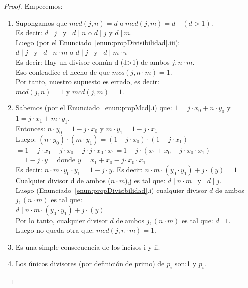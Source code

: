 \begin{proof} Empecemos:
\begin{enumerate}[label=\roman*)]
\item Supongamos que $mcd(j, n)=d$ \quad o \quad $mcd(j, m)=d \quad (d>1)$. \\
Es decir: $d \mid j$ \, y \, $d \mid n$ \quad\quad o \quad\quad $d \mid j$ y $d \mid m$.\\
Luego (por el Enunciado~\ref{enun:propDivisibilidad}.iii):\\
$d \mid j$ \, y \, $d \mid n \cdot m$ \quad o \quad $d \mid  j$ \, y \, $d \mid m \cdot n$\\
Es decir: Hay un divisor común d (d>1) de ambos $j,n \cdot m$.\\
Eso contradice el hecho de que $mcd(j,n \cdot m)=1$.\\
Por tanto, nuestro supuesto es errado, es decir:\\
$mcd(j, n)=1$ y $mcd(j, m)=1$.
\item Sabemos (por el Enunciado~\ref{enun:propMcd}.i) que: $1=j \cdot x_{0} + n \cdot y_{0}$ \quad y \quad $1=j \cdot x_{1} + m \cdot y_{1}$. \\
Entonces: $n \cdot y_{0}=1-j \cdot x_{0}$ \quad y \quad $m \cdot y_{1}=1-j \cdot x_{1}$ \\
Luego: $(n \cdot y_{0}) \cdot(m \cdot y_{1})=(1-j \cdot x_{0}) \cdot(1-j \cdot x_{1})$ \\
$=1-j \cdot x_{1}-j \cdot x_{0}+j \cdot j \cdot x_{0} \cdot x_{1}=1-j \cdot(x_{1}+x_{0}-j \cdot x_{0} \cdot x_{1})$ \\
$ =1-j \cdot y \quad \text { donde } y=x_{1}+x_{0}-j \cdot x_{0} \cdot x_{1} $ \\
Es decir: $n \cdot m \cdot y_{0} \cdot y_{1}=1-j \cdot y$. Es decir: $n \cdot m \cdot(y_{0} \cdot y_{1})+j \cdot(y)=1$\\
Cualquier divisor d de ambos ($n \cdot m$),j es tal que: $d \mid n \cdot m$ \, y \, $d \mid j$.\\
Luego (Enunciado~\ref{enun:propDivisibilidad}.i) cualquier divisor $d$ de ambos $j,(n \cdot m)$ es tal que:\\
$d \mid n \cdot m \cdot (y_{0} \cdot y_{1})+j \cdot(y)$\\
Por lo tanto, cualquier divisor $d$ de ambos $j,(n \cdot m)$ es tal que: $d \mid 1$.\\
Luego no queda otra que: $mcd(j, n \cdot m)=1$.
\item Es una simple consecuencia de los incisos i y ii.
\item Los únicos divisores (por definición de primo) de $p_i$ son:1 y $p_i$. \\

\end{enumerate}
\end{proof}
